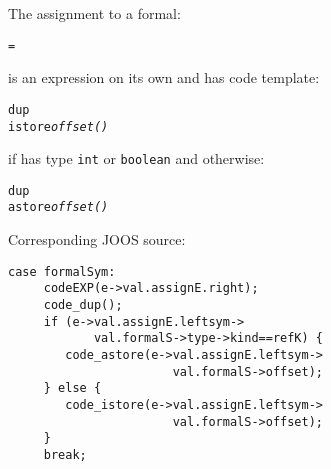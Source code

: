 \begin{slide*}
The assignment to a formal:
 
\begin{scriptsize}
\begin{alltt}
    =
\end{alltt}
\end{scriptsize}
 
is an expression on its own and has code template:
 
\begin{scriptsize}
\begin{alltt}
    dup
    istore {\em offset()}
\end{alltt}
\end{scriptsize}

if  has type {\tt int} or {\tt boolean} and otherwise:

\begin{scriptsize}
\begin{alltt}
    dup
    astore {\em offset()}
\end{alltt}
\end{scriptsize}

Corresponding JOOS source:
 
\begin{scriptsize}
\begin{verbatim}
case formalSym:
     codeEXP(e->val.assignE.right);
     code_dup();
     if (e->val.assignE.leftsym->
            val.formalS->type->kind==refK) {
        code_astore(e->val.assignE.leftsym->
                       val.formalS->offset);
     } else {
        code_istore(e->val.assignE.leftsym->
                       val.formalS->offset);
     }
     break;
\end{verbatim}
\end{scriptsize}
\vfil
\end{slide*}

